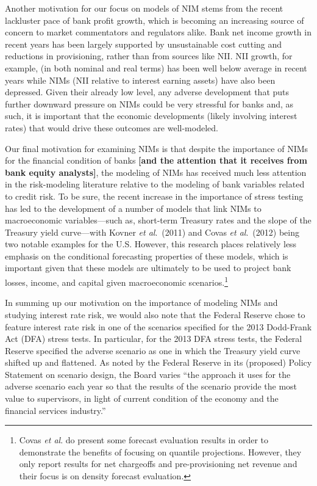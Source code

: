 \documentclass[11pt]{article}
\renewcommand{\baselinestretch}{1.5}
\begin{document}
Another motivation for our focus on models of NIM stems from the recent lackluster pace of bank profit growth, which is becoming an increasing source of concern to market commentators and regulators alike. Bank net income growth in recent years has been largely supported by unsustainable cost cutting and reductions in provisioning, rather than from sources like NII.  NII growth, for example, (in both nominal and real terms) has been well below average in recent years while NIMs (NII relative to interest earning assets) have also been depressed.%
Given their already low level, any adverse development that puts further downward pressure on NIMs could be very stressful for banks and, as such, it is important that the economic developments (likely involving interest rates) that would drive these outcomes are well-modeled.

Our final motivation for examining NIMs is that despite the importance of NIMs for the financial condition of banks \textbf{[and the attention that it receives from bank equity analysts]}, the modeling of NIMs has received much less attention in the risk-modeling literature relative to the modeling of bank variables related to credit risk.  To be sure, the recent increase in the importance of stress testing has led to the development of a number of models that link NIMs to macroeconomic variables---such as, short-term Treasury rates and the slope of the Treasury yield curve---with Kovner \textit{et al}.~(2011) and Covas \textit{et al}.~(2012) being two notable examples for the U.S.  However, this research places relatively less emphasis on the conditional forecasting properties of these models, which is important given that these models are ultimately to be used to project bank losses, income, and capital given macroeconomic scenarios.\renewcommand{\baselinestretch}{1}\footnote{Covas \textit{et al}. do present some forecast evaluation results in order to demonstrate the benefits of focusing on quantile projections. However, they only report results for net chargeoffs and pre-provisioning net revenue and their focus is on density forecast evaluation.\vspace{0.05in}}\renewcommand{\baselinestretch}{1.5}

In summing up our motivation on the importance of modeling NIMs and studying interest rate risk, we would also note that the Federal Reserve chose to feature interest rate risk in one of the scenarios specified for the 2013 Dodd-Frank Act (DFA) stress tests.  In particular, for the 2013 DFA stress tests, the Federal Reserve specified the adverse scenario as one in which the Treasury yield curve shifted up and flattened.  As noted by the Federal Reserve in its (proposed) Policy Statement on scenario design, the Board varies ``the approach it uses for the adverse scenario each year so that the results of the scenario provide the most value to supervisors, in light of current condition of the economy and the financial services industry.''
\end{document}
